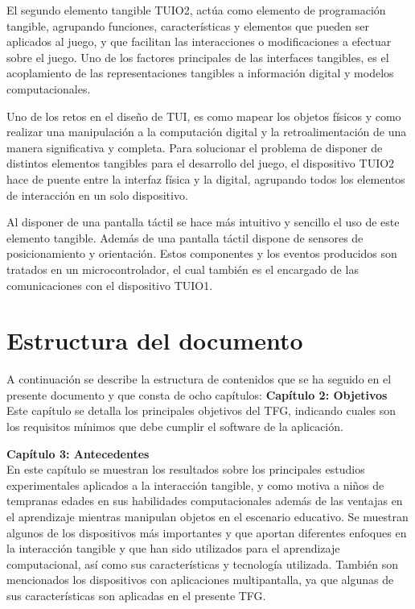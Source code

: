 El segundo elemento tangible TUIO2, actúa como elemento de programación tangible, agrupando funciones,
características y elementos que pueden ser aplicados al juego, y que facilitan las interacciones o
modificaciones a efectuar sobre el juego. Uno de los factores principales de las interfaces tangibles, es el acoplamiento de las representaciones tangibles a información digital y modelos computacionales. 

Uno de los retos en el diseño de TUI, es como mapear los objetos físicos y como realizar una manipulación a la computación digital y la retroalimentación de una manera significativa y completa.
Para solucionar el problema de disponer de distintos elementos tangibles para el desarrollo del juego, el dispositivo TUIO2 hace de puente entre la interfaz física y la digital, agrupando todos los elementos de interacción en un solo dispositivo. 

Al disponer de una pantalla táctil se hace más intuitivo y sencillo el uso de este elemento tangible. Además de una pantalla táctil dispone de sensores de posicionamiento y orientación. Estos componentes y los eventos producidos son tratados en un microcontrolador, el cual también es el encargado de las comunicaciones con el dispositivo TUIO1.


\section{Estructura del documento}

A continuación se describe la estructura de contenidos que se ha seguido en el presente documento y que consta de ocho capítulos:
\textbf{Capítulo 2: Objetivos}\\
Este capítulo se detalla los principales objetivos del TFG, indicando cuales son los requisitos mínimos que debe cumplir el software de la aplicación. 

\textbf{Capítulo 3: Antecedentes}\\
En este capítulo se muestran los resultados sobre los principales estudios experimentales aplicados a la interacción tangible, y como motiva a niños de tempranas edades en sus habilidades computacionales además de las ventajas en el aprendizaje mientras manipulan objetos en el escenario educativo.
Se muestran algunos de los dispositivos más importantes y que aportan diferentes enfoques en la interacción tangible y que han sido utilizados para el aprendizaje computacional, así como sus características y tecnología utilizada.
También son mencionados los dispositivos con aplicaciones multipantalla, ya que algunas de sus características son aplicadas en el presente TFG.

